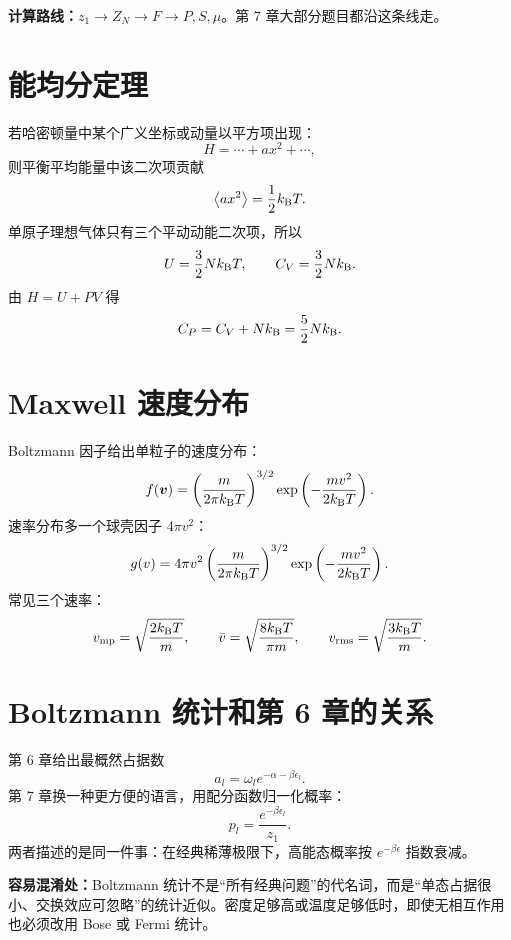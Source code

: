 \begin{keybox}
\textbf{计算路线：}$z_1\to Z_N\to F\to P,S,\mu$。第 7 章大部分题目都沿这条线走。
\end{keybox}

\section{能均分定理}

若哈密顿量中某个广义坐标或动量以平方项出现：
\[
  H=\cdots + a x^2+\cdots,
\]
则平衡平均能量中该二次项贡献
\[
  \left\langle a x^2 \right\rangle=\frac{1}{2}k_{\mathrm B} T.
\]
单原子理想气体只有三个平动动能二次项，所以
\[
  U=\frac{3}{2}Nk_{\mathrm B} T,\qquad
  C_V=\frac{3}{2}Nk_{\mathrm B}.
\]
由 $H=U+PV$ 得
\[
  C_P=C_V+Nk_{\mathrm B}=\frac{5}{2}Nk_{\mathrm B}.
\]

\section{Maxwell 速度分布}

Boltzmann 因子给出单粒子的速度分布：
\[
  f(\bm v)
  =
  \left(\frac{m}{2\pi k_{\mathrm B} T}\right)^{3/2}
  \exp\left(-\frac{mv^2}{2k_{\mathrm B} T}\right).
\]
速率分布多一个球壳因子 $4\pi v^2$：
\[
  g(v)=4\pi v^2
  \left(\frac{m}{2\pi k_{\mathrm B} T}\right)^{3/2}
  \exp\left(-\frac{mv^2}{2k_{\mathrm B} T}\right).
\]
常见三个速率：
\[
  v_{\rm mp}=\sqrt{\frac{2k_{\mathrm B} T}{m}},\qquad
  \bar v=\sqrt{\frac{8k_{\mathrm B} T}{\pi m}},\qquad
  v_{\rm rms}=\sqrt{\frac{3k_{\mathrm B} T}{m}}.
\]

\section{Boltzmann 统计和第 6 章的关系}

第 6 章给出最概然占据数
\[
  a_l=\omega_l e^{-\alpha-\beta\epsilon_l}.
\]
第 7 章换一种更方便的语言，用配分函数归一化概率：
\[
  p_l=\frac{e^{-\beta\epsilon_l}}{z_1}.
\]
两者描述的是同一件事：在经典稀薄极限下，高能态概率按 $e^{-\beta\epsilon}$ 指数衰减。

\begin{keybox}
\textbf{容易混淆处：}Boltzmann 统计不是“所有经典问题”的代名词，而是“单态占据很小、交换效应可忽略”的统计近似。密度足够高或温度足够低时，即使无相互作用也必须改用 Bose 或 Fermi 统计。
\end{keybox}
